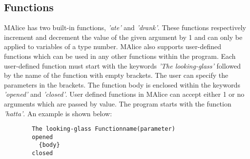 \documentclass[a4wide, 11pt]{article}
\begin{document}
	\subsection{Functions}
	\label{sec:func}
		MAlice has two built-in functions, \emph{'ate'} and \emph{'drank'}. These
		functions respectively increment and decrement the value of the given argument by 1 and 
		can only be applied to variables of a type number.
		MAlice also supports user-defined functions which can be used in any other functions
		within the program. Each user-defined function must start with the keywords
		\emph{'The looking-glass'} followed by the name of the function with empty brackets. The user can 
	 	specify the parameters in the brackets.	The function body is enclosed within the keywords \emph{'opened'}
		and \emph{'closed'}. User defined functions in MAlice can accept either 1 or no 
		arguments which are passed by value. The program starts with the function \emph{'hatta'}. An example is shown below:
		\begin{verbatim}
		The looking-glass Functionname(parameter)
		opened
		  {body}
		closed
		\end{verbatim}
	\newpage
\end{document}
